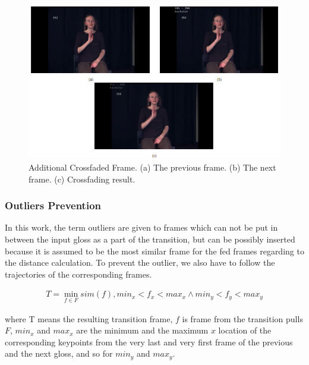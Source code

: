 \documentclass{sig-alternate-05-2015}
\begin{document}
\begin{figure}
	\centering
	\includegraphics[width=\linewidth]{img/crossfading.png}
	\caption{Additional Crossfaded Frame. (a) The previous frame. (b) The next frame. (c) Crossfading result.}
\end{figure}

\subsubsection{Outliers Prevention}
In this work, the term outliers are given to frames which can not be put in between the input gloss as a part of the transition, but can be possibly inserted because it is assumed to be the most similar frame for the fed frames regarding to the distance calculation. To prevent the outlier, we also have to follow the trajectories of the corresponding frames.

\begin{equation}
\begin{aligned}
T=\min_{f \in F}sim(f), min_x<f_x<max_x \land min_y<f_y<max_y
\end{aligned}
\end{equation}

where T means the resulting transition frame, \begin{math}f\end{math} is frame from the transition pulls \begin{math}F\end{math}, \begin{math}min_x\end{math} and \begin{math}max_x\end{math} are the minimum and the maximum \begin{math}x\end{math} location of the corresponding keypoints from the very last and very first frame of the previous and the next gloss, and so for \begin{math}min_y\end{math} and \begin{math}max_y\end{math}.
\end{document}
